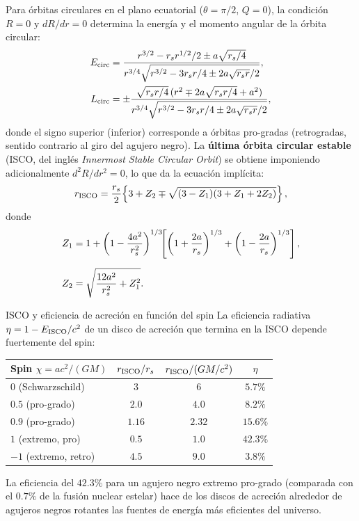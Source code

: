 Para órbitas circulares en el plano ecuatorial ($\theta = \pi/2$, $Q = 0$), la condición $R = 0$ y $dR/dr = 0$ determina la energía y el momento angular de la órbita circular:
\begin{align}
  E_{\rm circ} &= \frac{r^{3/2} - r_s r^{1/2}/2 \pm a\sqrt{r_s/4}}{r^{3/4}\sqrt{r^{3/2} - 3r_s r/4 \pm 2a\sqrt{r_s r}/2}},\\
  L_{\rm circ} &= \pm\frac{\sqrt{r_s r/4}\,(r^2 \mp 2a\sqrt{r_s r/4} + a^2)}{r^{3/4}\sqrt{r^{3/2} - 3r_s r/4 \pm 2a\sqrt{r_s r}/2}},
\end{align}
donde el signo superior (inferior) corresponde a órbitas pro-gradas (retrogradas, sentido contrario al giro del agujero negro). La \textbf{última órbita circular estable} (ISCO, del inglés \textit{Innermost Stable Circular Orbit}) se obtiene imponiendo adicionalmente $d^2R/dr^2 = 0$, lo que da la ecuación implícita:
\begin{equation}
  r_{\rm ISCO} = \frac{r_s}{2}\!\left\{3 + Z_2 \mp \sqrt{(3-Z_1)(3+Z_1+2Z_2)}\right\},
  \label{eq:isco_kerr}
\end{equation}
donde
\begin{align}
  Z_1 &= 1 + \left(1 - \frac{4a^2}{r_s^2}\right)^{1/3}\!\!
           \left[\left(1+\frac{2a}{r_s}\right)^{1/3} + \left(1-\frac{2a}{r_s}\right)^{1/3}\right],\nl
  Z_2 &= \sqrt{\frac{12a^2}{r_s^2} + Z_1^2}.
\end{align}

\begin{ejemplo}{ISCO y eficiencia de acreción en función del spin}{}
La eficiencia radiativa $\eta = 1 - E_{\rm ISCO}/c^2$ de un disco de acreción que termina en la ISCO depende fuertemente del spin:
\begin{center}
\begin{tabular}{lccc}
\hline
Spin $\chi = a c^2/(GM)$ & $r_{\rm ISCO}/r_s$ & $r_{\rm ISCO}/(GM/c^2)$ & $\eta$ \\
\hline
$0$ (Schwarzschild) & $3$  & $6$   & $5.7\%$  \\
$0.5$ (pro-grado)   & $2.0$ & $4.0$ & $8.2\%$  \\
$0.9$ (pro-grado)   & $1.16$ & $2.32$ & $15.6\%$ \\
$1$ (extremo, pro)  & $0.5$ & $1.0$ & $42.3\%$ \\
$-1$ (extremo, retro) & $4.5$ & $9.0$ & $3.8\%$ \\
\hline
\end{tabular}
\end{center}
La eficiencia del $42.3\%$ para un agujero negro extremo pro-grado (comparada con el $0.7\%$ de la fusión nuclear estelar) hace de los discos de acreción alrededor de agujeros negros rotantes las fuentes de energía más eficientes del universo.
\end{ejemplo}

